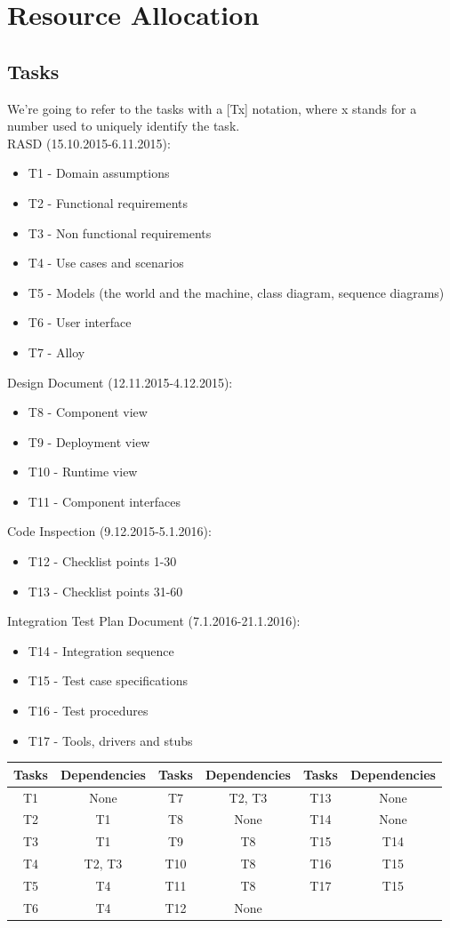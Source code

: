 \documentclass{article}
\begin{document}
\section{Resource Allocation}
\subsection{Tasks}
We're going to refer to the tasks with a [Tx] notation, where x stands for a number used to uniquely identify the task. \\
RASD (15.10.2015-6.11.2015):
\begin{itemize}
	\item T1 - Domain assumptions
	\item T2 -  Functional requirements
	\item T3 -  Non functional requirements
	\item T4 - Use cases and scenarios
	\item T5 - Models (the world and the machine, class diagram, sequence diagrams)
	\item T6 - User interface
	\item T7 - Alloy
\end{itemize}
Design Document (12.11.2015-4.12.2015):
\begin{itemize}
	\item T8 - Component view
	\item T9 - Deployment view
	\item T10 - Runtime view
	\item T11 - Component interfaces
\end{itemize}
Code Inspection (9.12.2015-5.1.2016):
\begin{itemize}
	\item T12 - Checklist points 1-30
	\item T13 - Checklist points 31-60
\end{itemize}
Integration Test Plan Document (7.1.2016-21.1.2016):
\begin{itemize}
	\item T14 - Integration sequence
	\item T15 - Test case specifications
	\item T16 - Test procedures
	\item T17 - Tools, drivers and stubs
\end{itemize}
\begin{table}[H]
	\begin{tabular}{c c | c c | c c}
		\toprule
		Tasks & Dependencies &  Tasks & Dependencies & Tasks & Dependencies\\
		\midrule
		T1 & None&T7 & T2, T3&T13 & None\\
		T2 & T1&T8 & None&T14 & None\\
		T3 & T1&T9 & T8&T15 & T14\\
		T4 & T2, T3&T10 & T8&T16 & T15\\
		T5 & T4&T11 & T8&T17 & T15\\
		T6 & T4&T12 & None& & \\
		\bottomrule
	\end{tabular}
\end{table}
\end{document}

